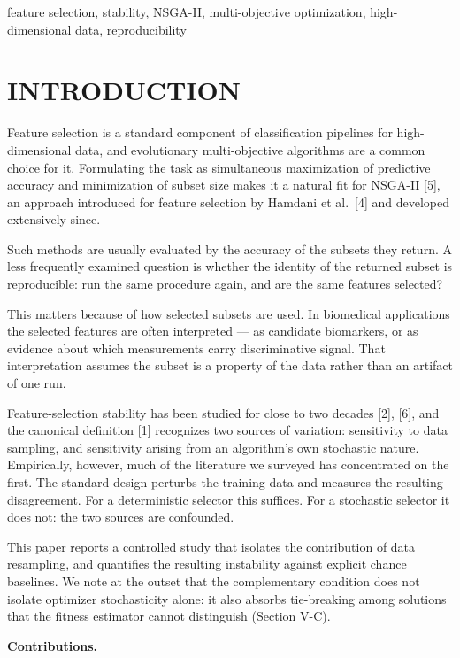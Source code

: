 \documentclass[conference]{IEEEtran}
\begin{document}
\begin{IEEEkeywords}
feature selection, stability, NSGA-II, multi-objective optimization, high-dimensional data, reproducibility
\end{IEEEkeywords}

\section{INTRODUCTION}

Feature selection is a standard component of classification pipelines for high-dimensional data, and evolutionary multi-objective algorithms are a common choice for it. Formulating the task as simultaneous maximization of predictive accuracy and minimization of subset size makes it a natural fit for NSGA-II [5], an approach introduced for feature selection by Hamdani et al.~[4] and developed extensively since.

Such methods are usually evaluated by the accuracy of the subsets they return. A less frequently examined question is whether the identity of the returned subset is reproducible: run the same procedure again, and are the same features selected?

This matters because of how selected subsets are used. In biomedical applications the selected features are often interpreted --- as candidate biomarkers, or as evidence about which measurements carry discriminative signal. That interpretation assumes the subset is a property of the data rather than an artifact of one run.

Feature-selection stability has been studied for close to two decades [2], [6], and the canonical definition [1] recognizes two sources of variation: sensitivity to data sampling, and sensitivity arising from an algorithm's own stochastic nature. Empirically, however, much of the literature we surveyed has concentrated on the first. The standard design perturbs the training data and measures the resulting disagreement. For a deterministic selector this suffices. For a stochastic selector it does not: the two sources are confounded.

This paper reports a controlled study that isolates the contribution of data resampling, and quantifies the resulting instability against explicit chance baselines. We note at the outset that the complementary condition does not isolate optimizer stochasticity alone: it also absorbs tie-breaking among solutions that the fitness estimator cannot distinguish (Section V-C).

\textbf{Contributions.}
\end{document}
